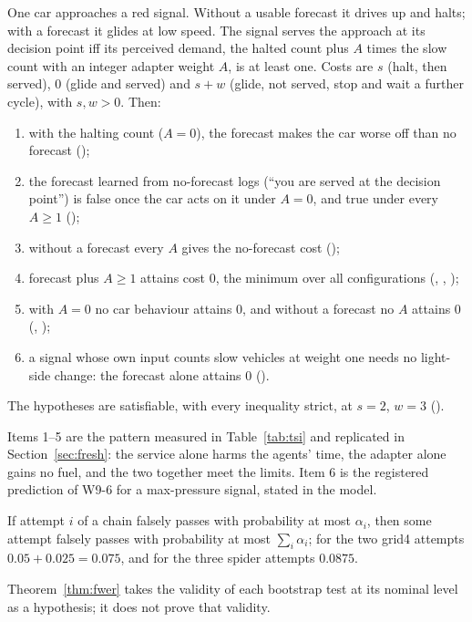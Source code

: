 \begin{theorem}\label{thm:twosided}
One car approaches a red signal. Without a usable forecast it drives up and halts; with a forecast it glides at low speed. The signal serves
the approach at its decision point iff its perceived demand, the halted count plus $A$ times the slow count with an integer adapter weight
$A$, is at least one. Costs are $s$ (halt, then served), $0$ (glide and served) and $s+w$ (glide, not served, stop and wait a further
cycle), with $s,w>0$. Then:
\begin{enumerate}\setlength\itemsep{0pt}
\item with the halting count ($A=0$), the forecast makes the car worse off than no forecast ();
\item the forecast learned from no-forecast logs (``you are served at the decision point'') is false once the car acts on it under $A=0$,
and true under every $A\ge1$ ();
\item without a forecast every $A$ gives the no-forecast cost ();
\item forecast plus $A\ge1$ attains cost 0, the minimum over all configurations (, ,
);
\item with $A=0$ no car behaviour attains 0, and without a forecast no $A$ attains 0 (,
);
\item a signal whose own input counts slow vehicles at weight one needs no light-side change: the forecast alone attains 0
().
\end{enumerate}
The hypotheses are satisfiable, with every inequality strict, at $s=2$, $w=3$ ().
\end{theorem}
Items 1--5 are the pattern measured in Table~\ref{tab:tsi} and replicated in Section~\ref{sec:fresh}: the service alone harms the agents'
time, the adapter alone gains no fuel, and the two together meet the limits. Item 6 is the registered prediction of W9-6 for a
max-pressure signal, stated in the model.

\begin{theorem}
\label{thm:fwer}
If attempt $i$ of a chain falsely passes with probability at most $\alpha_i$, then some attempt falsely passes with probability at most
$\sum_i\alpha_i$; for the two grid4 attempts $0.05+0.025=0.075$, and for the three spider attempts $0.0875$.
\end{theorem}
Theorem~\ref{thm:fwer} takes the validity of each bootstrap test at its nominal level as a hypothesis; it does not prove that validity.

